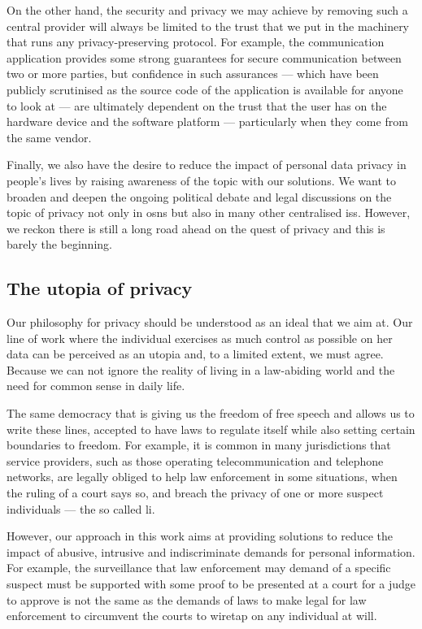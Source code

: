 On the other hand, the security and privacy we may achieve by removing such a central 
provider will always be limited to the trust that we put in the machinery that runs 
any privacy-preserving protocol. For example, the communication application \Signal 
provides some strong guarantees for secure communication between two or more parties, 
but confidence in such assurances --- which have been publicly scrutinised as 
the source code of the application is available for anyone to look at --- are ultimately 
dependent on the trust that the user has on the hardware device and the software platform 
--- particularly when they come from the same vendor.

Finally, we also have the desire to reduce the impact of personal data privacy in 
people's lives by raising awareness of the topic with our solutions. We want to 
broaden and deepen the ongoing political debate and legal discussions on the topic 
of privacy not only in \acp{osn} but also in many other centralised \acp{is}. However, 
we reckon there is still a long road ahead on the quest of privacy and this is barely 
the beginning.

\subsection{The utopia of privacy}
    \label{subsection:thesis:utopia-of-privacy}
Our philosophy for privacy should be understood as an ideal that we aim at. Our line 
of work where the individual exercises as much control as possible on her data can 
be perceived as an utopia and, to a limited extent, we must agree. Because we can 
not ignore the reality of living in a law-abiding world and the need for common 
sense in daily life. 

The same democracy that is giving us the freedom of free speech and allows us to 
write these lines, accepted to have laws to regulate itself while also setting certain 
boundaries to freedom. For example, it is common in many jurisdictions that service 
providers, such as those operating telecommunication and telephone networks, are 
legally obliged to help law enforcement in some situations, when the ruling of a 
court says so, and breach the privacy of one or more suspect individuals --- the 
so called \ac{li}.

However, our approach in this work aims at providing solutions to reduce the impact 
of abusive, intrusive and indiscriminate demands for personal information. For example, 
the surveillance that law enforcement may demand of a specific suspect must be supported 
with some proof to be presented at a court for a judge to approve is not the same 
as the demands of laws to make legal for law enforcement to circumvent the courts 
to wiretap on any individual at will.


